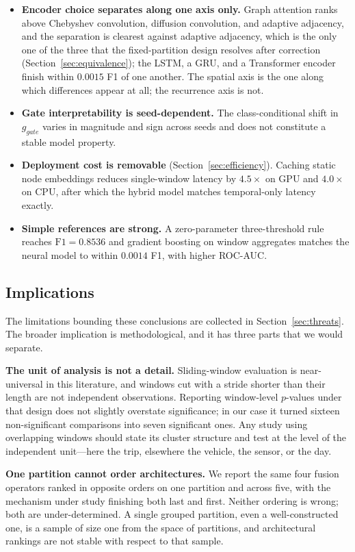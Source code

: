 \documentclass[journal]{IEEEtran}
\begin{document}
\begin{itemize}
  \item \textbf{Encoder choice separates along one axis only.} Graph attention ranks above Chebyshev convolution, diffusion convolution, and adaptive adjacency, and the separation is clearest against adaptive adjacency, which is the only one of the three that the fixed-partition design resolves after correction (Section~\ref{sec:equivalence}); the LSTM, a GRU, and a Transformer encoder finish within $0.0015$ F1 of one another. The spatial axis is the one along which differences appear at all; the recurrence axis is not.
  \item \textbf{Gate interpretability is seed-dependent.} The class-conditional shift in $g_{gate}$ varies in magnitude and sign across seeds and does not constitute a stable model property.
  \item \textbf{Deployment cost is removable} (Section~\ref{sec:efficiency}). Caching static node embeddings reduces single-window latency by $4.5\times$ on GPU and $4.0\times$ on CPU, after which the hybrid model matches temporal-only latency exactly.
  \item \textbf{Simple references are strong.} A zero-parameter three-threshold rule reaches $\mathrm{F1}=0.8536$ and gradient boosting on window aggregates matches the neural model to within $0.0014$ F1, with higher ROC-AUC.
\end{itemize}

\subsection{Implications}
The limitations bounding these conclusions are collected in Section~\ref{sec:threats}. The broader implication is methodological, and it has three parts that we would separate.

\textbf{The unit of analysis is not a detail.} Sliding-window evaluation is near-universal in this literature, and windows cut with a stride shorter than their length are not independent observations. Reporting window-level $p$-values under that design does not slightly overstate significance; in our case it turned sixteen non-significant comparisons into seven significant ones. Any study using overlapping windows should state its cluster structure and test at the level of the independent unit---here the trip, elsewhere the vehicle, the sensor, or the day.

\textbf{One partition cannot order architectures.} We report the same four fusion operators ranked in opposite orders on one partition and across five, with the mechanism under study finishing both last and first. Neither ordering is wrong; both are under-determined. A single grouped partition, even a well-constructed one, is a sample of size one from the space of partitions, and architectural rankings are not stable with respect to that sample.
\end{document}
